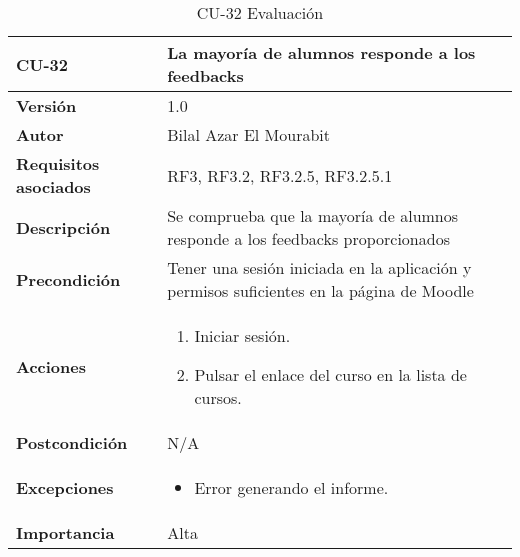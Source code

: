 \begin{table}[H]
	\centering
	\begin{tabularx}{\linewidth}{ p{} p{} }
		\toprule
		\textbf{CU-32}    & \textbf{La mayoría de alumnos responde a los feedbacks}\\
		\toprule
		\textbf{Versión}              & 1.0    \\
		\textbf{Autor}                & Bilal Azar El Mourabit \\
		\textbf{Requisitos asociados} & RF3, RF3.2, RF3.2.5, RF3.2.5.1\\
		\textbf{Descripción}          & Se comprueba que la mayoría de alumnos responde a los feedbacks proporcionados\\
    		\textbf{Precondición}         & Tener una sesión iniciada en la aplicación y permisos suficientes en la página de Moodle\\
		\textbf{Acciones}             & 
		\begin{enumerate}
			\def\labelenumi{\arabic{enumi}.}
			\tightlist
			\item Iniciar sesión.
            \item Pulsar el enlace del curso en la lista de cursos. 
		\end{enumerate}\\
		\textbf{Postcondición}        & N/A \\
		\textbf{Excepciones}          & \begin{itemize}
		    \item Error generando el informe.
		\end{itemize} \\
		\textbf{Importancia}          & Alta \\
		\bottomrule
	\end{tabularx}
	\caption{CU-32 Evaluación}
\end{table}

